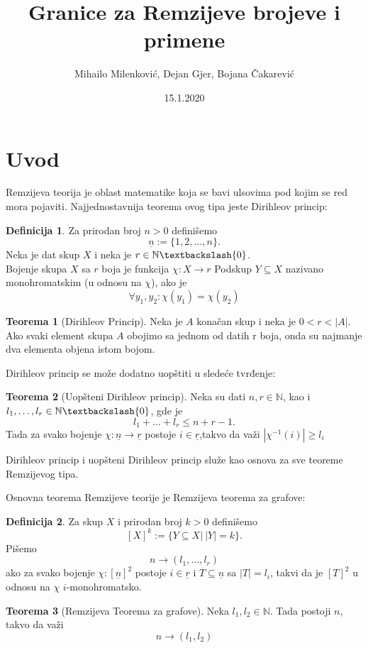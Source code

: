 \documentclass{article}
\title{Granice za Remzijeve brojeve i primene}
\date{15.1.2020}
\author{Mihailo Milenković, Dejan Gjer, Bojana Čakarević}
\theoremstyle{definition}
\newtheorem{definicija}{Definicija}[section]
\newtheorem{teorema}{Teorema}[section]
\begin{document}
	
	\maketitle
	
	\newpage
	
	\tableofcontents
	
	\newpage
	
	\section{Uvod}
	
	Remzijeva teorija je oblast matematike koja se bavi ulsovima pod kojim se red mora pojaviti. Najjednostavnija teorema ovog tipa jeste Dirihleov princip:
	
	\begin{definicija}
		Za prirodan broj $n>0$ definišemo 
		\[
		\underline{n}:=\{1,2,\ldots,n\}.
		\]
		Neka je dat skup $X$ i neka je $r\in \mathbb{N}\textbackslash \{0\}$.\\	
		Bojenje skupa $X$ sa $r$ boja je funkcija $\chi:X\rightarrow r$
		Podskup $Y\subseteq X$ nazivano monohromatskim (u odnosu na $\chi$), ako je
		\[
		\forall y_1,y_2:\chi(y_1)=\chi(y_2)
		\]
	\end{definicija}
	\begin{teorema}[Dirihleov Princip]
		Neka je $A$ konačan skup i neka je $0<r<|A|$.\\ Ako svaki element skupa $A$ obojimo sa jednom od datih r boja, onda su najmanje dva elementa objena istom bojom.
	\end{teorema}
	
	
	Dirihleov princip se može dodatno uopštiti u sledeće tvrđenje:
	\begin{teorema}[Uopšteni Dirihleov princip]
		Neka su dati $n,r \in \mathbb{N}$, kao i $l_1,\ldots,l_r \in \mathbb{N}\textbackslash\{0\}$, gde je
		\[
		l_1+\ldots+l_r\leq n+r-1.
		\]
		Tada za svako bojenje $\chi:\underline{n}\rightarrow\underline{r}$ postoje $i\in \underline{r}$,takvo da važi $|\chi^{-1}(i)|\geq l_i$
	\end{teorema}
	
	Dirihleov princip i uopšteni Dirihleov princip služe kao osnova za sve teoreme Remzijevog tipa.
	
	Osnovna teorema Remzijeve teorije je Remzijeva teorema za grafove:
	
	\begin{definicija}
		Za skup $X$ i prirodan broj $k>0$ definišemo
		\[
		[X]^k :=\{Y\subseteq X | \:|Y|=k\}.
		\]
		Pišemo
		\[
		n\rightarrow (l_1,\ldots,l_r)
		\]
		ako za svako bojenje $\chi:[\underline{n}]^2$ postoje $i\in \underline{r}$ i $T\subseteq \underline{n}$ sa $|T|=l_i$, takvi da je $[T]^2$ u odnosu na $\chi$ $i$-monohromatsko.	
	\end{definicija}
	\begin{teorema}[Remzijeva Teorema za grafove]
		Neka $l_1,l_2 \in \mathbb{N}$. Tada postoji $n$, takvo da važi
		\[
		n\rightarrow(l_1,l_2)
		\]
	\end{teorema}
	
\end{document}
